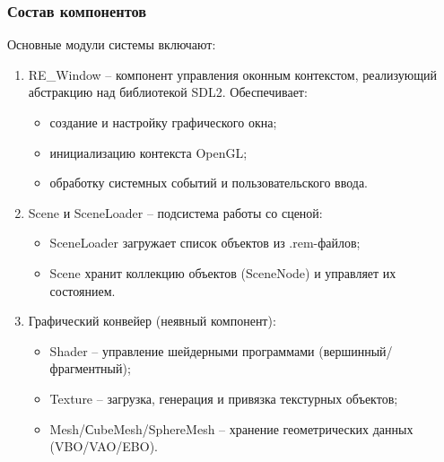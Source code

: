

\subsubsection{Состав компонентов}

Основные модули системы включают:

\begin{enumerate}
    \item RE\_Window -- компонент управления оконным контекстом, реализующий абстракцию над библиотекой SDL2. Обеспечивает:

    \begin{itemize}[itemindent=\parindent,leftmargin=\parindent]
        \item создание и настройку графического окна;
        \item инициализацию контекста OpenGL;
        \item обработку системных событий и пользовательского ввода.
    \end{itemize}

    \item Scene и SceneLoader -- подсистема работы со сценой:

    \begin{itemize}[itemindent=\parindent,leftmargin=\parindent]
        \item SceneLoader загружает список объектов из .rem-файлов;
        \item Scene хранит коллекцию объектов (SceneNode) и управляет их состоянием.
    \end{itemize}

    \item Графический конвейер (неявный компонент):

    \begin{itemize}[itemindent=\parindent,leftmargin=\parindent]
        \item Shader -- управление шейдерными программами (вершинный/фрагментный);
        \item Texture -- загрузка, генерация и привязка текстурных объектов;
        \item Mesh/СubeMesh/SphereMesh -- хранение геометрических данных (VBO/VAO/EBO).
    \end{itemize}


\end{enumerate}

